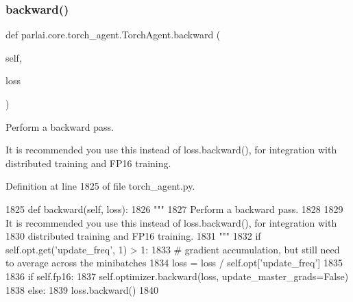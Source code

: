 \subsubsection{\texorpdfstring{backward()}{backward()}}
{\footnotesize\ttfamily def parlai.\+core.\+torch\+\_\+agent.\+Torch\+Agent.\+backward (\begin{DoxyParamCaption}\item[{}]{self,  }\item[{}]{loss }\end{DoxyParamCaption})}

\begin{DoxyVerb}Perform a backward pass.

It is recommended you use this instead of loss.backward(), for integration with
distributed training and FP16 training.
\end{DoxyVerb}
 

Definition at line 1825 of file torch\+\_\+agent.\+py.


\begin{DoxyCode}
1825     \textcolor{keyword}{def }backward(self, loss):
1826         \textcolor{stringliteral}{"""}
1827 \textcolor{stringliteral}{        Perform a backward pass.}
1828 \textcolor{stringliteral}{}
1829 \textcolor{stringliteral}{        It is recommended you use this instead of loss.backward(), for integration with}
1830 \textcolor{stringliteral}{        distributed training and FP16 training.}
1831 \textcolor{stringliteral}{        """}
1832         \textcolor{keywordflow}{if} self.opt.get(\textcolor{stringliteral}{'update\_freq'}, 1) > 1:
1833             \textcolor{comment}{# gradient accumulation, but still need to average across the minibatches}
1834             loss = loss / self.opt[\textcolor{stringliteral}{'update\_freq'}]
1835 
1836         \textcolor{keywordflow}{if} self.fp16:
1837             self.optimizer.backward(loss, update\_master\_grads=\textcolor{keyword}{False})
1838         \textcolor{keywordflow}{else}:
1839             loss.backward()
1840 
\end{DoxyCode}
\mbox{\label{classparlai_1_1core_1_1torch__agent_1_1TorchAgent_a7754a74d6c87590f46e71ec486c285a8}} 
